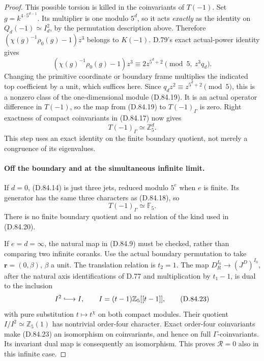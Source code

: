 \begin{proof}
This possible torsion is killed in the coinvariants of
\(T(-1)\). Set \(g=k^{4\cdot5^{d-1}}\). Its multiplier
is one modulo \(5^d\), so it acts \emph{exactly} as the
identity on \(Q_d(-1)\simeq I_d^2\), by the permutation
description above. Therefore
\((\chi(g)^{-1}\rho_0(g)-1)z^3\) belongs to \(K(-1)\).
D.79's exact actual-power identity gives
\[
 (\chi(g)^{-1}\rho_0(g)-1)z^3
             \equiv 2z^{5^d+2}
                  \pmod{5,\ z^3q_d}.                           \tag{D.84.20}
\]
Changing the primitive coordinate or boundary frame multiplies
the indicated top coefficient by a unit, which suffices here.
Since \(q_dz^2\equiv z^{5^d+2}\pmod5\), this is a nonzero
class of the one-dimensional module (D.84.19). It is an actual
operator difference in \(T(-1)\), so the map from (D.84.19)
to \(T(-1)_\Gamma\) is zero. Right exactness of compact
coinvariants in (D.84.17) now gives
\[
                         T(-1)_\Gamma\simeq\mathbb Z_5^d.
                                                                  \tag{D.84.21}
\]
This step uses an exact identity on the finite boundary
quotient, not merely a congruence of its eigenvalues.

\paragraph{Off the boundary and at the simultaneous infinite limit.}
If \(d=0\), (D.84.14) is just three jets, reduced modulo
\(5^e\) when \(e\) is finite. Its generator has the same
three characters as (D.84.18), so
\[
                         T(-1)_\Gamma\simeq\mathbb F_5.
                                                                  \tag{D.84.22}
\]
There is no finite boundary quotient and no relation of
the kind used in (D.84.20).

If \(e=d=\infty\), the natural map in (D.84.9) must be
checked, rather than comparing two infinite coranks.
Use the actual boundary permutation to take
\(\mathbf r=(0,\beta)\), \(\beta\) a unit.
The translation relation is \(t_2=1\).
The map \(D_R^{I_0}\to(J^D)^{I_0}\), after the natural
axis identifications of D.77 and multiplication by
\(t_1-1\), is dual to the inclusion
\[
 I^2\lhook\joinrel\longrightarrow I,
 \qquad I=(t-1)\mathbb Z_5[[t-1]],
                                                                  \tag{D.84.23}
\]
with pure substitution \(t\mapsto t^\chi\) on both compact
modules. Their quotient \(I/I^2\simeq\mathbb Z_5(1)\)
has nontrivial order-four character. Exact order-four
coinvariants make (D.84.23) an isomorphism on coinvariants,
and hence on full \(\Gamma\)-coinvariants. Its invariant
dual map is consequently an isomorphism. This proves
\(\mathcal R=0\) also in this infinite case.


\end{proof}
